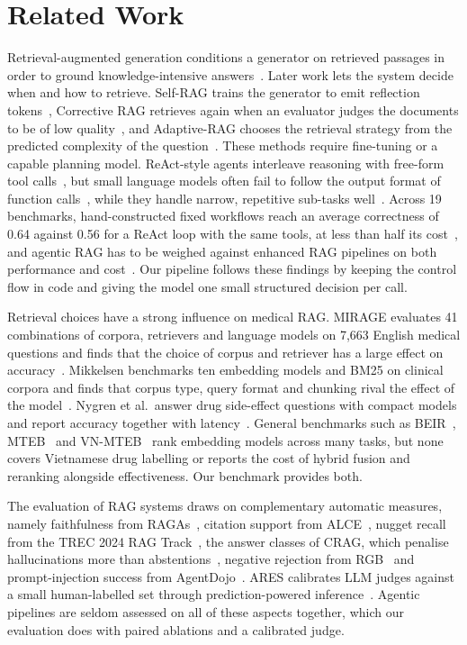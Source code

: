 \section{Related Work}\label{sec:related}

Retrieval-augmented generation conditions a generator on retrieved passages in order to ground knowledge-intensive answers~\cite{lewis2020rag}. Later work lets the system decide when and how to retrieve. Self-RAG trains the generator to emit reflection tokens~\cite{asai2024selfrag}, Corrective RAG retrieves again when an evaluator judges the documents to be of low quality~\cite{yan2024crag}, and Adaptive-RAG chooses the retrieval strategy from the predicted complexity of the question~\cite{jeong2024adaptiverag}. These methods require fine-tuning or a capable planning model. ReAct-style agents interleave reasoning with free-form tool calls~\cite{yao2023react}, but small language models often fail to follow the output format of function calls~\cite{kavathekar2025small}, while they handle narrow, repetitive sub-tasks well~\cite{belcak2025slm}. Across 19 benchmarks, hand-constructed fixed workflows reach an average correctness of 0.64 against 0.56 for a ReAct loop with the same tools, at less than half its cost~\cite{kumar2026practical}, and agentic RAG has to be weighed against enhanced RAG pipelines on both performance and cost~\cite{ferrazzi2026agentic}. Our pipeline follows these findings by keeping the control flow in code and giving the model one small structured decision per call.

Retrieval choices have a strong influence on medical RAG. MIRAGE evaluates 41 combinations of corpora, retrievers and language models on 7{,}663 English medical questions and finds that the choice of corpus and retriever has a large effect on accuracy~\cite{xiong2024medrag}. Mikkelsen benchmarks ten embedding models and BM25 on clinical corpora and finds that corpus type, query format and chunking rival the effect of the model~\cite{mikkelsen2026clinical}. Nygren et al.\ answer drug side-effect questions with compact models and report accuracy together with latency~\cite{nygren2026drug}. General benchmarks such as BEIR~\cite{thakur2021beir}, MTEB~\cite{muennighoff2023mteb} and VN-MTEB~\cite{pham2025vnmteb} rank embedding models across many tasks, but none covers Vietnamese drug labelling or reports the cost of hybrid fusion and reranking alongside effectiveness. Our benchmark provides both.

The evaluation of RAG systems draws on complementary automatic measures, namely faithfulness from RAGAs~\cite{es2024ragas}, citation support from ALCE~\cite{gao2023alce}, nugget recall from the TREC 2024 RAG Track~\cite{pradeep2024nuggets}, the answer classes of CRAG, which penalise hallucinations more than abstentions~\cite{yang2024cragbench}, negative rejection from RGB~\cite{chen2024rgb} and prompt-injection success from AgentDojo~\cite{debenedetti2024agentdojo}. ARES calibrates LLM judges against a small human-labelled set through prediction-powered inference~\cite{saadfalcon2024ares,angelopoulos2023ppi}. Agentic pipelines are seldom assessed on all of these aspects together, which our evaluation does with paired ablations and a calibrated judge.


